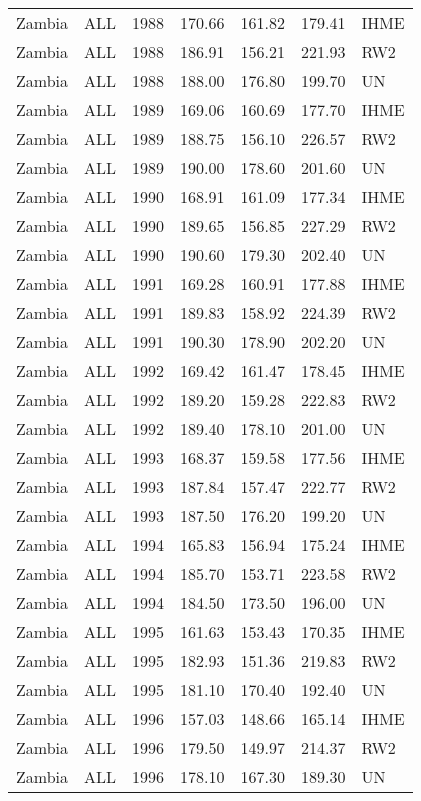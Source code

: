 \begin{longtable}{lllrrrl}
  Zambia & ALL & 1988 & 170.66 & 161.82 & 179.41 & IHME \\ 
  Zambia & ALL & 1988 & 186.91 & 156.21 & 221.93 & RW2 \\ 
  Zambia & ALL & 1988 & 188.00 & 176.80 & 199.70 & UN \\ 
  Zambia & ALL & 1989 & 169.06 & 160.69 & 177.70 & IHME \\ 
  Zambia & ALL & 1989 & 188.75 & 156.10 & 226.57 & RW2 \\ 
  Zambia & ALL & 1989 & 190.00 & 178.60 & 201.60 & UN \\ 
  Zambia & ALL & 1990 & 168.91 & 161.09 & 177.34 & IHME \\ 
  Zambia & ALL & 1990 & 189.65 & 156.85 & 227.29 & RW2 \\ 
  Zambia & ALL & 1990 & 190.60 & 179.30 & 202.40 & UN \\ 
  Zambia & ALL & 1991 & 169.28 & 160.91 & 177.88 & IHME \\ 
  Zambia & ALL & 1991 & 189.83 & 158.92 & 224.39 & RW2 \\ 
  Zambia & ALL & 1991 & 190.30 & 178.90 & 202.20 & UN \\ 
  Zambia & ALL & 1992 & 169.42 & 161.47 & 178.45 & IHME \\ 
  Zambia & ALL & 1992 & 189.20 & 159.28 & 222.83 & RW2 \\ 
  Zambia & ALL & 1992 & 189.40 & 178.10 & 201.00 & UN \\ 
  Zambia & ALL & 1993 & 168.37 & 159.58 & 177.56 & IHME \\ 
  Zambia & ALL & 1993 & 187.84 & 157.47 & 222.77 & RW2 \\ 
  Zambia & ALL & 1993 & 187.50 & 176.20 & 199.20 & UN \\ 
  Zambia & ALL & 1994 & 165.83 & 156.94 & 175.24 & IHME \\ 
  Zambia & ALL & 1994 & 185.70 & 153.71 & 223.58 & RW2 \\ 
  Zambia & ALL & 1994 & 184.50 & 173.50 & 196.00 & UN \\ 
  Zambia & ALL & 1995 & 161.63 & 153.43 & 170.35 & IHME \\ 
  Zambia & ALL & 1995 & 182.93 & 151.36 & 219.83 & RW2 \\ 
  Zambia & ALL & 1995 & 181.10 & 170.40 & 192.40 & UN \\ 
  Zambia & ALL & 1996 & 157.03 & 148.66 & 165.14 & IHME \\ 
  Zambia & ALL & 1996 & 179.50 & 149.97 & 214.37 & RW2 \\ 
  Zambia & ALL & 1996 & 178.10 & 167.30 & 189.30 & UN \\ 

\end{longtable}
